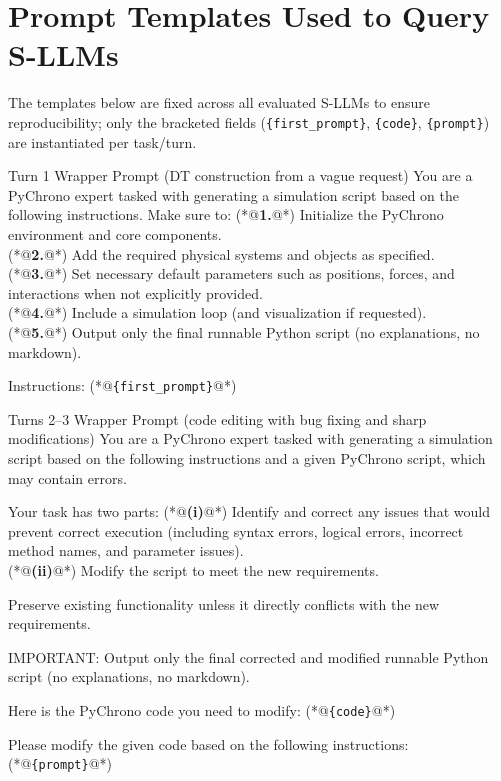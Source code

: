 \section{Prompt Templates Used to Query S-LLMs}
\label{app:prompt_templates}

\noindent The templates below are fixed across all evaluated S-LLMs to ensure reproducibility; only the bracketed fields (\texttt{\{first\_prompt\}}, \texttt{\{code\}}, \texttt{\{prompt\}}) are instantiated per task/turn.

\begin{PromptBlock}{Turn 1 Wrapper Prompt (DT construction from a vague request)}
You are a PyChrono expert tasked with generating a simulation script based on the following instructions. Make sure to:
(*@\textbf{1.}@*) Initialize the PyChrono environment and core components.\\
(*@\textbf{2.}@*) Add the required physical systems and objects as specified.\\
(*@\textbf{3.}@*) Set necessary default parameters such as positions, forces, and interactions when not explicitly provided.\\
(*@\textbf{4.}@*) Include a simulation loop (and visualization if requested).\\
(*@\textbf{5.}@*) Output only the final runnable Python script (no explanations, no markdown).

Instructions:
(*@\texttt{\{first\_prompt\}}@*)
\end{PromptBlock}

\begin{PromptBlock}{Turns 2--3 Wrapper Prompt (code editing with bug fixing and sharp modifications)}
You are a PyChrono expert tasked with generating a simulation script based on the following instructions and a given PyChrono script, which may contain errors.

Your task has two parts:
(*@\textbf{(i)}@*) Identify and correct any issues that would prevent correct execution (including syntax errors, logical errors, incorrect method names, and parameter issues).\\
(*@\textbf{(ii)}@*) Modify the script to meet the new requirements.

Preserve existing functionality unless it directly conflicts with the new requirements.

IMPORTANT: Output only the final corrected and modified runnable Python script (no explanations, no markdown).

Here is the PyChrono code you need to modify:
(*@\texttt{\{code\}}@*)

Please modify the given code based on the following instructions:
(*@\texttt{\{prompt\}}@*)
\end{PromptBlock}


